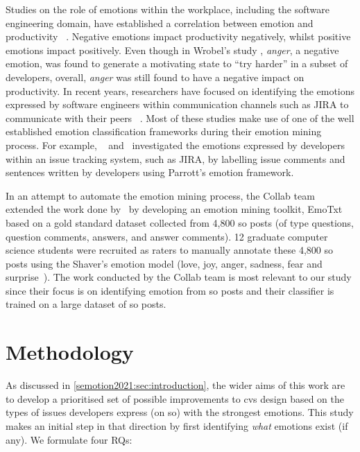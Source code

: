 Studies on the role of emotions within the workplace, including the software engineering domain, have established a correlation between emotion and productivity ~\citep{wrobel2013, wrobel2020}. Negative emotions impact productivity negatively, whilst positive emotions impact positively. Even though in Wrobel's study \citep{wrobel2013}, \textit{anger}, a negative emotion, was found to generate a motivating state to ``try harder'' in a subset of developers,  overall, \textit{anger} was still found to have a negative impact on productivity. In recent years, researchers have focused on identifying the emotions expressed by software engineers within communication channels such as JIRA to communicate with their peers ~\citep{murgia2014, ortu2016, gachechiladze2017, novielli2018}. Most of these studies make use of one of the well established emotion classification frameworks during their emotion mining process. For example, ~\citet{murgia2014} and~\citet{ortu2016} investigated the emotions expressed by developers within an issue tracking system, such as JIRA, by labelling issue comments and sentences written by developers using Parrott's emotion framework. %

In an attempt to automate the emotion mining process, the Collab team~\citep{calefato2017, novielli2018} extended the work done by~\citet{ortu2016} by developing an emotion mining toolkit, EmoTxt~\citep{calefato2017} based on a gold standard dataset collected from 4,800 \gls{so} posts (of type questions, question comments, answers, and answer comments). 12 graduate computer science students were recruited as raters to manually annotate these 4,800 \gls{so} posts using the Shaver's emotion model (love, joy, anger, sadness, fear and surprise~\citep{shaver1987}). The work conducted by the Collab team is most relevant to our study since their focus is on identifying emotion from \gls{so} posts and their classifier is trained on a large dataset of \gls{so} posts.

\section{Methodology}\label{semotion2021:sec:methodology}

As discussed in \cref{semotion2021:sec:introduction}, the wider aims of this work are to develop a prioritised set of possible improvements to \gls{cvs} design based on the types of issues developers express (on \gls{so}) with the strongest emotions. This study makes an initial step in that direction by first identifying \textit{what} emotions exist (if any). We formulate four RQs:


